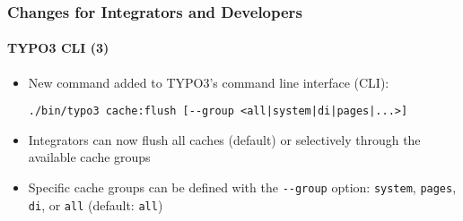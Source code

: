 %

\begin{frame}[fragile]
	\frametitle{Changes for Integrators and Developers}
	\framesubtitle{TYPO3 CLI (3)}


	\begin{itemize}
		\item New command added to TYPO3's command line interface (CLI):
\begin{lstlisting}
./bin/typo3 cache:flush [--group <all|system|di|pages|...>]
\end{lstlisting}
		\item Integrators can now flush all caches (default) or selectively
			through the available cache groups
		\item Specific cache groups can be defined with the
			\texttt{-}\texttt{-group} option:\newline
			\small\texttt{system}, \texttt{pages}, \texttt{di}, or \texttt{all} (default: \texttt{all})\normalsize
	\end{itemize}
\end{frame}

